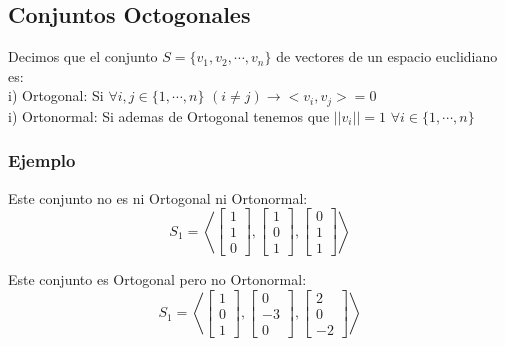 \documentclass[12pt]{article}							    %
\begin{document}
\subsection{Conjuntos Octogonales}
Decimos que el conjunto $S = \{v_1, v_2, \cdots, v_n \}$ de vectores de un espacio euclidiano es: \\

i) Ortogonal: Si $\forall i, j \in \{1, \cdots, n \}$ $(i\neq j) \to <v_i, v_j> = 0$ \\

i) Ortonormal: Si ademas de Ortogonal tenemos que $||v_i|| = 1$ $\forall i\in \{1, \cdots, n \}$

\subsubsection{Ejemplo}

Este conjunto no es ni Ortogonal ni Ortonormal:
\begin{equation*}
    S_1 = \left< \begin{bmatrix} 1\\1\\0\end{bmatrix} , \begin{bmatrix} 1\\0\\1\end{bmatrix}, \begin{bmatrix} 0\\1\\1\end{bmatrix} \right> 
\end{equation*}

Este conjunto es Ortogonal pero no Ortonormal:
\begin{equation*}
    S_1 = \left< \begin{bmatrix} 1\\0\\1\end{bmatrix} , \begin{bmatrix} 0\\-3\\0\end{bmatrix}, \begin{bmatrix} 2\\0\\-2\end{bmatrix} \right> 
\end{equation*}
\end{document}
